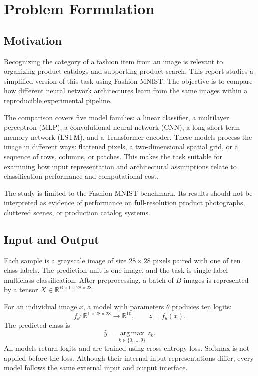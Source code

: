 \section{Problem Formulation}
\label{sec:problem-formulation}

\subsection{Motivation}

Recognizing the category of a fashion item from an image is relevant to organizing product catalogs and supporting product search. This report studies a simplified version of this task using Fashion-MNIST. The objective is to compare how different neural network architectures learn from the same images within a reproducible experimental pipeline.

The comparison covers five model families: a linear classifier, a multilayer perceptron (MLP), a convolutional neural network (CNN), a long short-term memory network (LSTM), and a Transformer encoder. These models process the image in different ways: flattened pixels, a two-dimensional spatial grid, or a sequence of rows, columns, or patches. This makes the task suitable for examining how input representation and architectural assumptions relate to classification performance and computational cost.

The study is limited to the Fashion-MNIST benchmark. Its results should not be interpreted as evidence of performance on full-resolution product photographs, cluttered scenes, or production catalog systems.

\subsection{Input and Output}

Each sample is a grayscale image of size $28\times28$ pixels paired with one of ten class labels. The prediction unit is one image, and the task is single-label multiclass classification. After preprocessing, a batch of $B$ images is represented by a tensor $X\in\mathbb{R}^{B\times1\times28\times28}$.

For an individual image $x$, a model with parameters $\theta$ produces ten logits:
\begin{equation}
    f_{\theta}:\mathbb{R}^{1\times28\times28}\rightarrow\mathbb{R}^{10},
    \qquad z=f_{\theta}(x).
\end{equation}
The predicted class is
\begin{equation}
    \hat{y}=\operatorname*{arg\,max}_{k\in\{0,\ldots,9\}} z_k.
\end{equation}
All models return logits and are trained using cross-entropy loss. Softmax is not applied before the loss. Although their internal input representations differ, every model follows the same external input and output interface.

